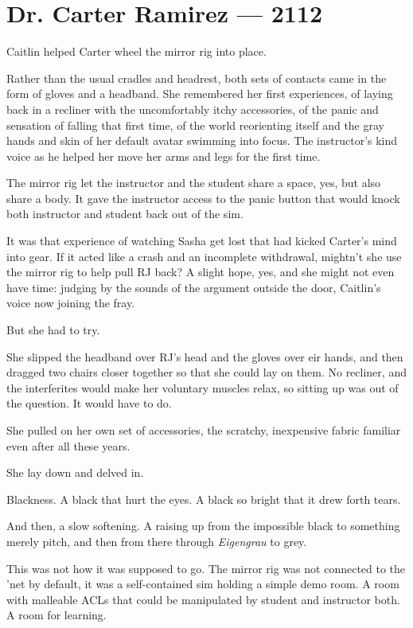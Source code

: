 \hypertarget{dr-carter-ramirez-2112}{%
\chapter*{Dr. Carter Ramirez — 2112}\label{dr-carter-ramirez-2112}}

Caitlin helped Carter wheel the mirror rig into place.

Rather than the usual cradles and headrest, both sets of contacts came in the form of gloves and a headband. She remembered her first experiences, of laying back in a recliner with the uncomfortably itchy accessories, of the panic and sensation of falling that first time, of the world reorienting itself and the gray hands and skin of her default avatar swimming into focus. The instructor's kind voice as he helped her move her arms and legs for the first time.

The mirror rig let the instructor and the student share a space, yes, but also share a body. It gave the instructor access to the panic button that would knock both instructor and student back out of the sim.

It was that experience of watching Sasha get lost that had kicked Carter's mind into gear. If it acted like a crash and an incomplete withdrawal, mightn't she use the mirror rig to help pull RJ back? A slight hope, yes, and she might not even have time: judging by the sounds of the argument outside the door, Caitlin's voice now joining the fray.

But she had to try.

She slipped the headband over RJ's head and the gloves over eir hands, and then dragged two chairs closer together so that she could lay on them. No recliner, and the interferites would make her voluntary muscles relax, so sitting up was out of the question. It would have to do.

She pulled on her own set of accessories, the scratchy, inexpensive fabric familiar even after all these years.

She lay down and delved in.

Blackness. A black that hurt the eyes. A black so bright that it drew forth tears.

And then, a slow softening. A raising up from the impossible black to something merely pitch, and then from there through \emph{Eigengrau} to grey.

This was not how it was supposed to go. The mirror rig was not connected to the 'net by default, it was a self-contained sim holding a simple demo room. A room with malleable ACLs that could be manipulated by student and instructor both. A room for learning.

